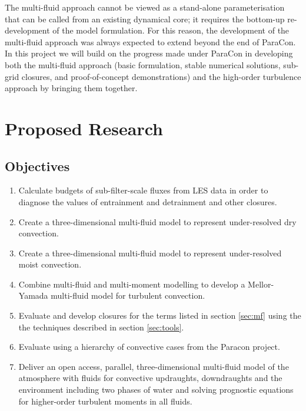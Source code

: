 \documentclass[11pt,a4paper]{article}
\begin{document}
The multi-fluid approach cannot be viewed as a stand-alone parameterisation that can be called from an existing dynamical core; it requires the bottom-up re-development of the model formulation. For this reason, the development of the multi-fluid approach was always expected to extend beyond the end of ParaCon. In this project we will build on the progress made under ParaCon in developing both the multi-fluid approach (basic formulation, stable numerical solutions, sub-grid closures, and proof-of-concept demonstrations) and the high-order turbulence approach by bringing them together.

\section{Proposed Research}

\subsection{Objectives}

\begin{enumerate}
\item\label{it:budgets} Calculate budgets of sub-filter-scale fluxes from LES data in order to diagnose the values of entrainment and detrainment and other closures.

\item Create a three-dimensional multi-fluid model to represent under-resolved dry convection.

\item Create a three-dimensional multi-fluid model to represent under-resolved moist convection.

\item Combine multi-fluid and multi-moment modelling to develop a Mellor-Yamada multi-fluid model for turbulent convection.

\item Evaluate and develop closures for the terms listed in section \ref{sec:mf} using the the techniques described in section \ref{sec:tools}.

\item Evaluate using a hierarchy of convective cases from the Paracon project.

\item Deliver an open access, parallel, three-dimensional multi-fluid model of the atmosphere with fluids for convective updraughts, downdraughts and the environment including two phases of water and solving prognostic equations for higher-order turbulent moments in all fluids.
\end{enumerate}
\end{document}
